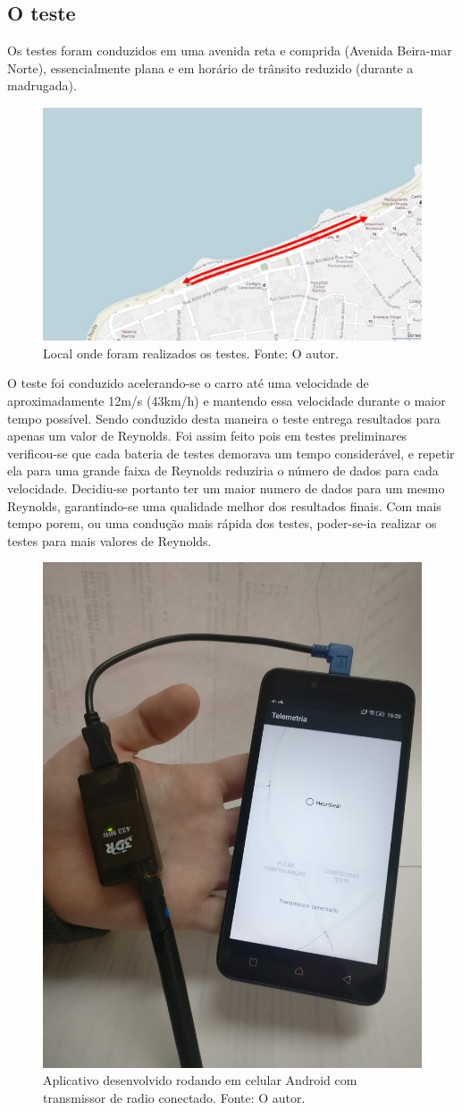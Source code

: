 \subsection{O teste}

Os testes foram conduzidos em uma avenida reta e comprida (Avenida Beira-mar Norte), essencialmente plana e em horário de trânsito reduzido (durante a madrugada).

\begin{figure}[!ht]
    \centering
    \includegraphics[width=.5\linewidth]{figuras/internet/here_open_street_maps_setas.png}
    \caption{Local onde foram realizados os testes. Fonte: O autor.}
    \label{fig:mapa_teste}
\end{figure}

O teste foi conduzido acelerando-se o carro até uma velocidade de aproximadamente 12m/s (43km/h) e mantendo essa velocidade durante o maior tempo possível. Sendo conduzido desta maneira o teste entrega resultados para apenas um valor de Reynolds. Foi assim feito pois em testes preliminares verificou-se que cada bateria de testes demorava um tempo considerável, e repetir ela para uma grande faixa de Reynolds reduziria o número de dados para cada velocidade. Decidiu-se portanto ter um maior numero de dados para um mesmo Reynolds, garantindo-se uma qualidade melhor dos resultados finais. Com mais tempo porem, ou uma condução mais rápida dos testes, poder-se-ia realizar os testes para mais valores de Reynolds.  

\begin{figure}[!ht]
    \centering
    \includegraphics[width=.4\linewidth]{figuras/calibracao/app_celular.jpg}
    \caption{Aplicativo desenvolvido rodando em celular Android com transmissor de radio conectado. Fonte: O autor.}
    \label{fig:app_celular}
\end{figure}

